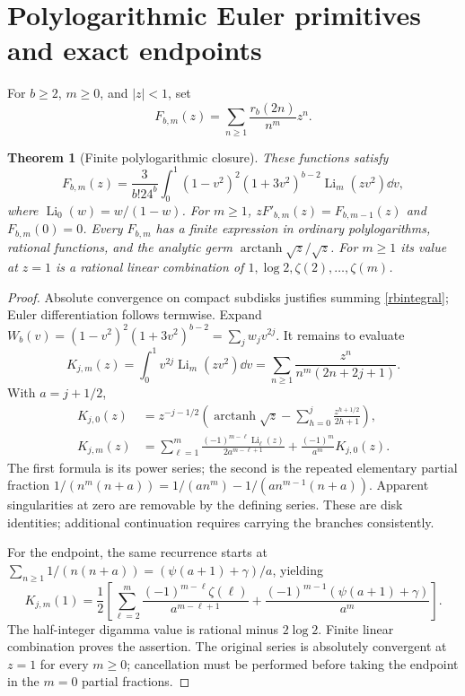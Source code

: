 \documentclass[11pt]{article}
\numberwithin{equation}{section}
\newtheorem{theorem}{Theorem}[section]
\theoremstyle{definition}\newtheorem{definition}[theorem]{Definition}
\theoremstyle{remark}\newtheorem{remark}[theorem]{Remark}
\DeclareMathOperator{\Li}{Li}\DeclareMathOperator{\FP}{FP}\DeclareMathOperator{\wt}{wt}
\begin{document}
\section{Polylogarithmic Euler primitives and exact endpoints}
For $b\ge2$, $m\ge0$, and $|z|<1$, set
\begin{equation}\label{polylogdef}
 F_{b,m}(z)=\sum_{n\ge1}\frac{r_b(2n)}{n^m}z^n.
\end{equation}
\begin{theorem}[Finite polylogarithmic closure]\label{polylogs}
These functions satisfy
\begin{equation}\label{polylogint}
 F_{b,m}(z)=\frac3{b!24^b}\int_0^1
 (1-v^2)^2(1+3v^2)^{b-2}\Li_m(zv^2)\dd v,
\end{equation}
where $\Li_0(w)=w/(1-w)$. For $m\ge1$,
$zF'_{b,m}(z)=F_{b,m-1}(z)$ and $F_{b,m}(0)=0$.
Every $F_{b,m}$ has a finite expression in ordinary polylogarithms, rational functions, and the analytic germ $\operatorname{arctanh}\sqrt z/\sqrt z$. For $m\ge1$ its value at $z=1$ is a rational linear combination of $1,\log2,\zeta(2),\ldots,\zeta(m)$.
\end{theorem}
\begin{proof}
Absolute convergence on compact subdisks justifies summing \eqref{rbintegral}; Euler differentiation follows termwise. Expand
$W_b(v)=(1-v^2)^2(1+3v^2)^{b-2}=\sum_jw_jv^{2j}$.
It remains to evaluate
\[
 K_{j,m}(z)=\int_0^1v^{2j}\Li_m(zv^2)\dd v
 =\sum_{n\ge1}\frac{z^n}{n^m(2n+2j+1)}.
\]
With $a=j+1/2$,
\begin{align}
 K_{j,0}(z)&=z^{-j-1/2}\left(\operatorname{arctanh}\sqrt z
             -\sum_{h=0}^j\frac{z^{h+1/2}}{2h+1}\right),\label{kzero}\\
 K_{j,m}(z)&=\sum_{\ell=1}^m
   \frac{(-1)^{m-\ell}\Li_\ell(z)}{2a^{m-\ell+1}}
   +\frac{(-1)^m}{a^m}K_{j,0}(z).\label{krecursion}
\end{align}
The first formula is its power series; the second is the repeated elementary partial fraction
$1/(n^m(n+a))=1/(an^m)-1/(an^{m-1}(n+a))$.
Apparent singularities at zero are removable by the defining series. These are disk identities; additional continuation requires carrying the branches consistently.

For the endpoint, the same recurrence starts at
$\sum_{n\ge1}1/(n(n+a))=(\psi(a+1)+\gamma)/a$, yielding
\begin{equation}\label{kendpoint}
 K_{j,m}(1)=\frac12\left[
 \sum_{\ell=2}^m\frac{(-1)^{m-\ell}\zeta(\ell)}{a^{m-\ell+1}}
 +\frac{(-1)^{m-1}(\psi(a+1)+\gamma)}{a^m}\right].
\end{equation}
The half-integer digamma value is rational minus $2\log2$. Finite linear combination proves the assertion. The original series is absolutely convergent at $z=1$ for every $m\ge0$; cancellation must be performed before taking the endpoint in the $m=0$ partial fractions.
\end{proof}
\end{document}
